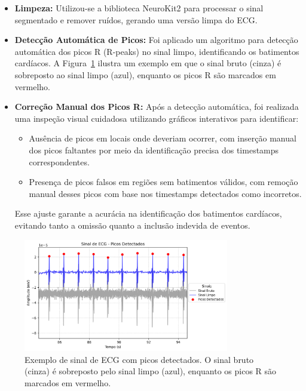 \begin{itemize}
    \item \textbf{Limpeza:} Utilizou-se a biblioteca NeuroKit2 para processar o sinal segmentado e remover ruídos, gerando uma versão limpa do ECG.
    
    \item \textbf{Detecção Automática de Picos:} Foi aplicado um algoritmo para detecção automática dos picos R (R-peaks) no sinal limpo, identificando os batimentos cardíacos. A Figura~\ref{fig:ecg_picos_detectados} ilustra um exemplo em que o sinal bruto (cinza) é sobreposto ao sinal limpo (azul), enquanto os picos R são marcados em vermelho.
    
    \item \textbf{Correção Manual dos Picos R:} Após a detecção automática, foi realizada uma inspeção visual cuidadosa utilizando gráficos interativos para identificar:
    \begin{itemize}
        \item Ausência de picos em locais onde deveriam ocorrer, com inserção manual dos picos faltantes por meio da identificação precisa dos timestamps correspondentes.
        \item Presença de picos falsos em regiões sem batimentos válidos, com remoção manual desses picos com base nos timestamps detectados como incorretos.
    \end{itemize}
    Esse ajuste garante a acurácia na identificação dos batimentos cardíacos, evitando tanto a omissão quanto a inclusão indevida de eventos.
\end{itemize}

\begin{figure}[htb]
    \centering
    \includegraphics[width=0.8\textwidth]{figs/2_preprocessamento_ecg/1_Sinal_de_ECG_-_Picos_Detectados_zoom.png}
    \caption{Exemplo de sinal de ECG com picos detectados. O sinal bruto (cinza) é sobreposto pelo sinal limpo (azul), enquanto os picos R são marcados em vermelho.}
    \label{fig:ecg_picos_detectados}
\end{figure}

